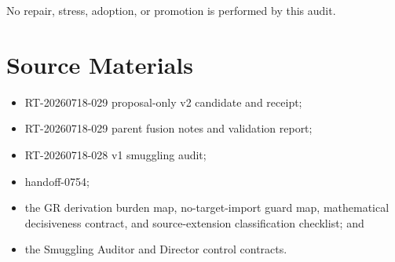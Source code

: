 \documentclass[11pt]{article}
\begin{document}
No repair, stress, adoption, or promotion is performed by this audit.

\section{Source Materials}

\begin{itemize}[leftmargin=*]
  \item RT-20260718-029 proposal-only v2 candidate and receipt;
  \item RT-20260718-029 parent fusion notes and validation report;
  \item RT-20260718-028 v1 smuggling audit;
  \item handoff-0754;
  \item the GR derivation burden map, no-target-import guard map,
  mathematical decisiveness contract, and source-extension classification
  checklist; and
  \item the Smuggling Auditor and Director control contracts.
\end{itemize}
\end{document}
